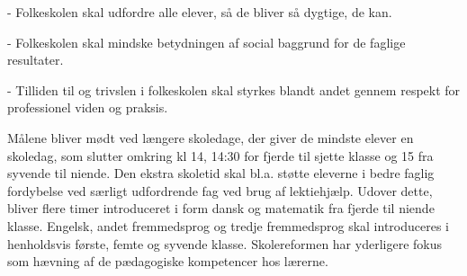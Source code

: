 -	Folkeskolen skal udfordre alle elever, så de bliver så dygtige, de kan.

-	Folkeskolen skal mindske betydningen af social baggrund for de faglige resultater.

-	Tilliden til og trivslen i folkeskolen skal styrkes blandt andet gennem respekt for professionel viden og praksis.

Målene bliver mødt ved længere skoledage, der giver de mindste elever en skoledag, som slutter omkring kl 14, 14:30 for fjerde til sjette klasse og 15 fra syvende til niende. Den ekstra skoletid skal bl.a. støtte eleverne i bedre faglig fordybelse ved særligt udfordrende fag ved brug af lektiehjælp. Udover dette, bliver flere timer introduceret i form dansk og matematik fra fjerde til niende klasse. Engelsk, andet fremmedsprog og tredje fremmedsprog skal introduceres i henholdsvis første, femte og syvende klasse. 
Skolereformen har yderligere fokus som hævning af de pædagogiske kompetencer hos lærerne.
